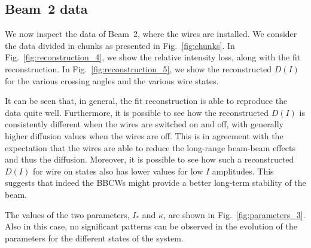 \subsection*{Beam~2 data}

We now inspect the data of Beam~2, where the wires are installed. We consider the data divided in chunks as presented in Fig.~\ref{fig:chunks}. In Fig.~\ref{fig:reconstruction_4}, we show the relative intensity loss, along with the fit reconstruction. In Fig.~\ref{fig:reconstruction_5}, we show the reconstructed $D(I)$ for the various crossing angles and the various wire states.

It can be seen that, in general, the fit reconstruction is able to reproduce the data quite well. Furthermore, it is possible to see how the reconstructed $D(I)$ is consistently different when the wires are switched on and off, with generally higher diffusion values when the wires are off. This is in agreement with the expectation that the wires are able to reduce the long-range beam-beam effects and thus the diffusion. Moreover, it is possible to see how such a reconstructed $D(I)$ for wire on states also has lower values for low $I$ amplitudes. This suggests that indeed the BBCWs might provide a better long-term stability of the beam.

The values of the two parameters, $I_\ast$ and $\kappa$, are shown in Fig.~\ref{fig:parameters_3}. Also in this case, no significant patterns can be observed in the evolution of the parameters for the different states of the system.



